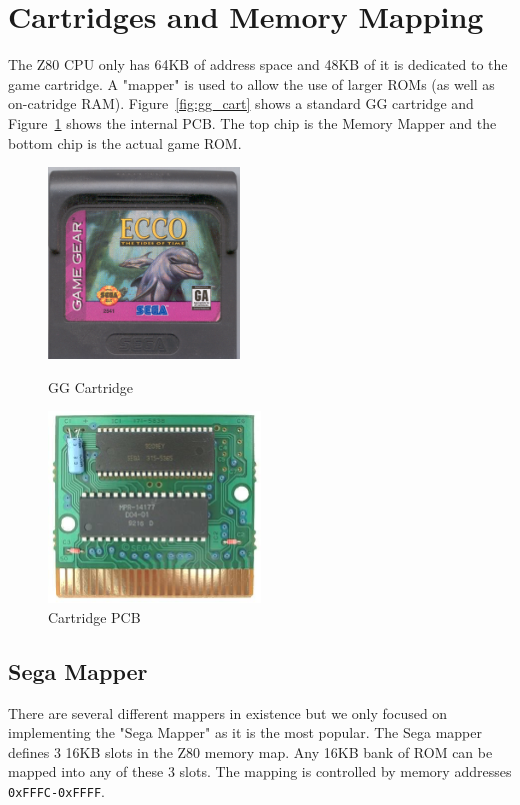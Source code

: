 \documentclass{article}
\begin{document}
\newpage
\section{Cartridges and Memory Mapping}
The Z80 CPU only has 64KB of address space and 48KB of it is dedicated to the
game cartridge. A "mapper" is used to allow the use of larger ROMs (as well as
on-catridge RAM). Figure~\ref{fig:gg_cart} shows a standard GG cartridge and
Figure~\ref{fig:gg_cart_pcb} shows the internal PCB. The top chip is the Memory
Mapper and the bottom chip is the actual game ROM.

\begin{figure}[H]
    \centering
    \begin{minipage}[b]{0.3\linewidth}
        \centering
        \includegraphics[height=2in]{../images/gg_cart.png}
        \caption{GG Cartridge \protect\cite{gg_cart}}
        \label{fig:gg_cart}
    \end{minipage}
    \hspace{1.5cm}
    \begin{minipage}[b]{0.3\linewidth}
        \centering
        \includegraphics[height=2in]{../images/gg_cart_pcb.png}
        \caption{Cartridge PCB \protect\cite{gg_cart_pcb}}
        \label{fig:gg_cart_pcb}
    \end{minipage}
\end{figure}

\subsection{Sega Mapper}
There are several different mappers in existence but we only focused on
implementing the "Sega Mapper" as it is the most popular.  The Sega mapper
defines 3 16KB slots in the Z80 memory map. Any 16KB bank of ROM can be mapped
into any of these 3 slots. The mapping is controlled by memory addresses
\texttt{0xFFFC-0xFFFF}.
\end{document}
